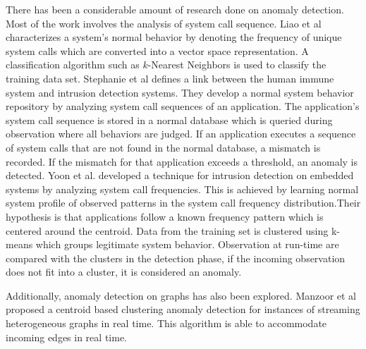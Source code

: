 There has been a considerable amount of research done on anomaly detection. Most of the work involves the analysis of system call sequence. Liao et al \cite{liao_using_2002} characterizes a system's normal behavior by denoting the frequency of unique system calls which are converted into a vector space representation. A classification algorithm such as $k$-Nearest Neighbors is used to classify the training data set. Stephanie et al \cite{Hofmeyr} defines a link between the human immune system and intrusion detection systems. They develop a normal system behavior repository by analyzing system call sequences of an application. The application's system call sequence is stored in a normal database which is queried during observation where all behaviors are judged. If an application executes a sequence of system calls that are not found in the normal database, a mismatch is recorded. If the mismatch for that application exceeds a threshold, an anomaly is detected. Yoon et al. \cite{Yoon} developed a technique for intrusion detection on embedded systems by analyzing system call frequencies. This is achieved by learning normal system profile of observed patterns in the system call frequency distribution.Their hypothesis is that applications follow a known frequency pattern which is centered around the centroid. Data from the training set is  clustered using k-means which groups legitimate system behavior. Observation at run-time are compared with the clusters in the detection phase, if the incoming observation does not fit into a cluster, it is considered an anomaly. \par Additionally, anomaly detection on graphs has also been explored. Manzoor et al \cite{manzoor_fast_2016} proposed a centroid based clustering anomaly detection for instances of streaming heterogeneous graphs in real time.  This algorithm is able to accommodate incoming edges in real time. 
